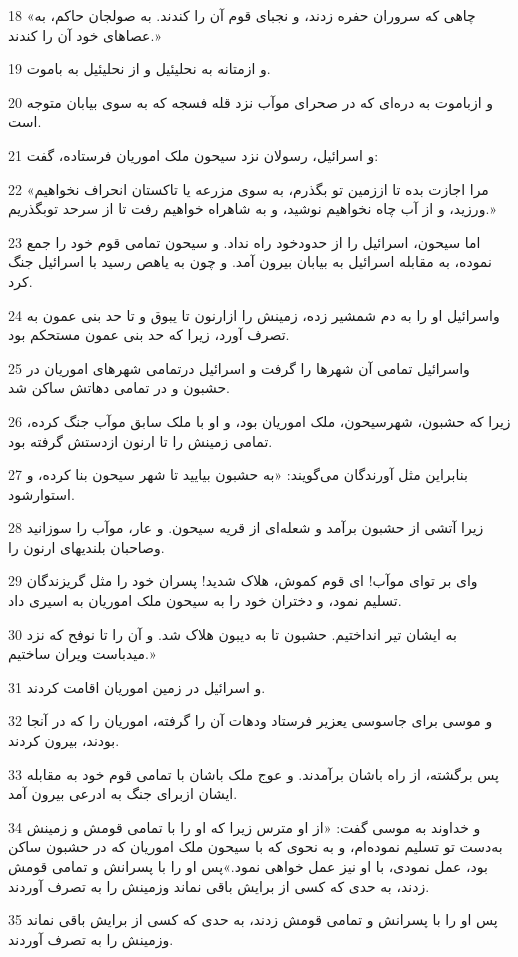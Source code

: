 \par 18 «چاهی که سروران حفره زدند، و نجبای قوم آن را کندند. به صولجان حاکم، به عصاهای خود آن را کندند.»
\par 19 و ازمتانه به نحلیئیل و از نحلیئیل به باموت.
\par 20 و ازباموت به دره‌ای که در صحرای موآب نزد قله فسجه که به سوی بیابان متوجه است.
\par 21 و اسرائیل، رسولان نزد سیحون ملک اموریان فرستاده، گفت:
\par 22 «مرا اجازت بده تا اززمین تو بگذرم، به سوی مزرعه یا تاکستان انحراف نخواهیم ورزید، و از آب چاه نخواهیم نوشید، و به شاهراه خواهیم رفت تا از سرحد توبگذریم.»
\par 23 اما سیحون، اسرائیل را از حدودخود راه نداد. و سیحون تمامی قوم خود را جمع نموده، به مقابله اسرائیل به بیابان بیرون آمد. و چون به یاهص رسید با اسرائیل جنگ کرد.
\par 24 واسرائیل او را به دم شمشیر زده، زمینش را ازارنون تا یبوق و تا حد بنی عمون به تصرف آورد، زیرا که حد بنی عمون مستحکم بود.
\par 25 واسرائیل تمامی آن شهرها را گرفت و اسرائیل درتمامی شهرهای اموریان در حشبون و در تمامی دهاتش ساکن شد.
\par 26 زیرا که حشبون، شهرسیحون، ملک اموریان بود، و او با ملک سابق موآب جنگ کرده، تمامی زمینش را تا ارنون ازدستش گرفته بود.
\par 27 بنابراین مثل آورندگان می‌گویند: «به حشبون بیایید تا شهر سیحون بنا کرده، و استوارشود.
\par 28 زیرا آتشی از حشبون برآمد و شعله‌ای از قریه سیحون. و عار، موآب را سوزانید وصاحبان بلندیهای ارنون را.
\par 29 وای بر تو‌ای موآب! ای قوم کموش، هلاک شدید! پسران خود را مثل گریزندگان تسلیم نمود، و دختران خود را به سیحون ملک اموریان به اسیری داد.
\par 30 به ایشان تیر انداختیم. حشبون تا به دیبون هلاک شد. و آن را تا نوفح که نزد میدباست ویران ساختیم.»
\par 31 و اسرائیل در زمین اموریان اقامت کردند.
\par 32 و موسی برای جاسوسی یعزیر فرستاد ودهات آن را گرفته، اموریان را که در آنجا بودند، بیرون کردند.
\par 33 پس برگشته، از راه باشان برآمدند. و عوج ملک باشان با تمامی قوم خود به مقابله ایشان ازبرای جنگ به ادرعی بیرون آمد.
\par 34 و خداوند به موسی گفت: «از او مترس زیرا که او را با تمامی قومش و زمینش به‌دست تو تسلیم نموده‌ام، و به نحوی که با سیحون ملک اموریان که در حشبون ساکن بود، عمل نمودی، با او نیز عمل خواهی نمود.»پس او را با پسرانش و تمامی قومش زدند، به حدی که کسی از برایش باقی نماند وزمینش را به تصرف آوردند.
\par 35 پس او را با پسرانش و تمامی قومش زدند، به حدی که کسی از برایش باقی نماند وزمینش را به تصرف آوردند.
 
